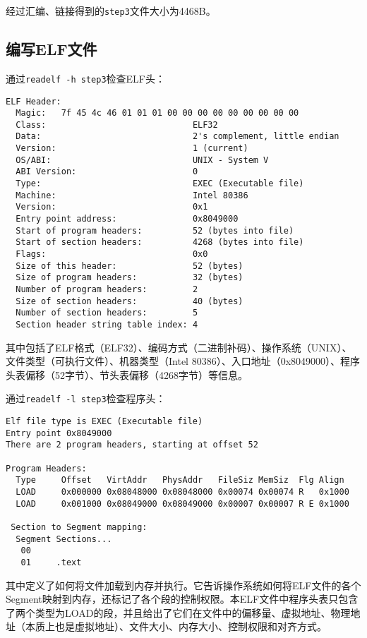 \documentclass[a4paper, 11pt]{ctexart}
\begin{document}
经过汇编、链接得到的\texttt{step3}文件大小为4468B。

\subsection{编写ELF文件}
\label{sec:elf}

通过\texttt{readelf -h step3}检查ELF头：

\begin{verbatim}
ELF Header:
  Magic:   7f 45 4c 46 01 01 01 00 00 00 00 00 00 00 00 00 
  Class:                             ELF32
  Data:                              2's complement, little endian
  Version:                           1 (current)
  OS/ABI:                            UNIX - System V
  ABI Version:                       0
  Type:                              EXEC (Executable file)
  Machine:                           Intel 80386
  Version:                           0x1
  Entry point address:               0x8049000
  Start of program headers:          52 (bytes into file)
  Start of section headers:          4268 (bytes into file)
  Flags:                             0x0
  Size of this header:               52 (bytes)
  Size of program headers:           32 (bytes)
  Number of program headers:         2
  Size of section headers:           40 (bytes)
  Number of section headers:         5
  Section header string table index: 4
\end{verbatim}

其中包括了ELF格式（ELF32）、编码方式（二进制补码）、操作系统（UNIX）、文件类型（可执行文件）、机器类型（Intel 80386）、入口地址（0x8049000）、程序头表偏移（52字节）、节头表偏移（4268字节）等信息。

通过\texttt{readelf -l step3}检查程序头：

\begin{verbatim}
Elf file type is EXEC (Executable file)
Entry point 0x8049000
There are 2 program headers, starting at offset 52

Program Headers:
  Type     Offset   VirtAddr   PhysAddr   FileSiz MemSiz  Flg Align
  LOAD     0x000000 0x08048000 0x08048000 0x00074 0x00074 R   0x1000
  LOAD     0x001000 0x08049000 0x08049000 0x00007 0x00007 R E 0x1000

 Section to Segment mapping:
  Segment Sections...
   00     
   01     .text
\end{verbatim}

其中定义了如何将文件加载到内存并执行。它告诉操作系统如何将ELF文件的各个Segment映射到内存，还标记了各个段的控制权限。本ELF文件中程序头表只包含了两个类型为LOAD的段，并且给出了它们在文件中的偏移量、虚拟地址、物理地址（本质上也是虚拟地址）、文件大小、内存大小、控制权限和对齐方式。
\end{document}
